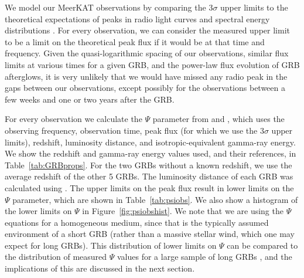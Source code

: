 \documentclass[12pt]{article}
\begin{document}
We model our MeerKAT observations by comparing the $3\sigma$ upper limits to the theoretical expectations of peaks in radio light curves and spectral energy distributions \citep{2017MNRAS.472.3161B,2023MNRAS.518.1522D}. For every observation, we can consider the measured upper limit to be a limit on the theoretical peak flux if it would be at that time and frequency. Given the quasi-logarithmic spacing of our observations, similar flux limits at various times for a given GRB, and the power-law flux evolution of GRB afterglows, it is very unlikely that we would have missed any radio peak in the gaps between our observations, except possibly for the observations between a few weeks and one or two years after the GRB. 

For every observation we calculate the $\Psi$ parameter from \citet{2017MNRAS.472.3161B} and \citet{2023MNRAS.518.1522D}, which uses the observing frequency, observation time, peak flux (for which we use the $3\sigma$ upper limits), redshift, luminosity distance, and isotropic-equivalent gamma-ray energy. We show the redshift and gamma-ray energy values used, and their references, in Table~\ref{tab:GRBprops}. For the two GRBs without a known redshift, we use the average redshift of the other 5 GRBs. The luminosity distance of each GRB was calculated using \citet{2006PASP..118.1711W}. The upper limits on the peak flux result in lower limits on the $\Psi$ parameter, which are shown in Table~\ref{tab:psiobs}. We also show a histogram of the lower limits on $\Psi$ in Figure~\ref{fig:psiobshist}. We note that we are using the $\Psi$ equations for a homogeneous medium, since that is the typically assumed environment of a short GRB (rather than a massive stellar wind, which one may expect for long GRBs). This distribution of lower limits on $\Psi$ can be compared to the distribution of measured $\Psi$ values for a large sample of long GRBs \citep{2023MNRAS.518.1522D}, and the implications of this are discussed in the next section.
\end{document}
